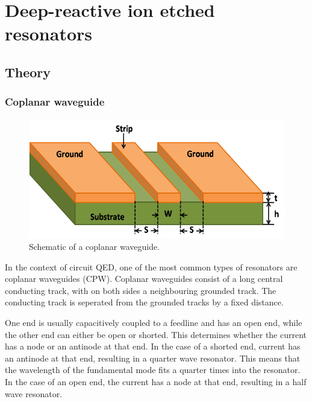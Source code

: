 \label{part:DRIE}












\part{Deep-reactive ion etched resonators\protect{}}
\label{chapter:Resonators}

\chapter{Theory}
  \label{ch:theory}

  \section{Coplanar waveguide}

    \begin{figure}
        \begin{center}
            \includegraphics[width=\textwidth]{Figures/DRIE/CPW.png}
        \end{center}
        \caption{Schematic of a coplanar waveguide.}
        \label{fig:CPW}
    \end{figure}

    In the context of circuit QED, one of the most common types of resonators are coplanar waveguides (CPW). Coplanar waveguides consist of a long central conducting track, with on both sides a neighbouring grounded track. The conducting track is seperated from the grounded tracks by a fixed distance.

    One end is usually capacitively coupled to a feedline and has an open end, while the other end can either be open or shorted. This determines whether the current has a node or an antinode at that end. In the case of a shorted end, current has an antinode at that end, resulting in a quarter wave resonator. This means that the wavelength of the fundamental mode fits a quarter times into the resonator. In the case of an open end, the current has a node at that end, resulting in a half wave resonator.


